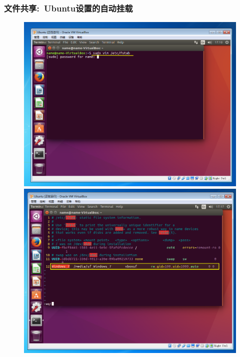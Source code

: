 \frame
{
	\frametitle{文件共享:~\textrm{Ubuntu}设置的自动挂载}
\begin{figure}[h!]
\centering
\vspace{17.5pt}
\includegraphics[height=0.38\textwidth]{Figures/Virtualbox-add-9.png}
\includegraphics[height=0.38\textwidth]{Figures/Virtualbox-add-10.png}
\label{Virtualbox-add-9}
\end{figure}
}
